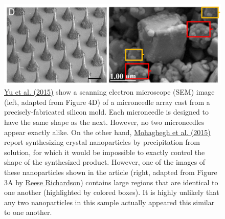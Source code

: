 \documentclass[letterpaper, 12pt]{article}
\begin{document}
\begin{figure}[h!tbp]
    \centering
    \includegraphics[width=\textwidth]{img/responses/yu_vs_mohaghegh_0.PNG}
    \caption*{\href{https://doi.org/10.1073/pnas.1505405112}{Yu et al. (2015)} show a scanning electron microscope (SEM) image (left, adapted from Figure 4D) of a microneedle array cast from a precisely-fabricated silicon mold. Each microneedle is designed to have the same shape as the next. However, no two microneedles appear exactly alike. On the other hand, \href{https://doi.org/10.1007/s10853-015-9003-3}{Mohaghegh et al. (2015)} report synthesizing crystal nanoparticles by precipitation from solution, for which it would be impossible to exactly control the shape of the synthesized product. However, one of the images of these nanoparticles shown in the article (right, adapted from Figure 3A by \href{https://pubpeer.com/publications/7BE7C2A93C385F700F1C6B5BC90294\#1}{Reese Richardson}) contains large regions that are identical to one another (highlighted by colored boxes). It is highly unlikely that any two nanoparticles in this sample actually appeared this similar to one another.}
\end{figure}
\end{document}
